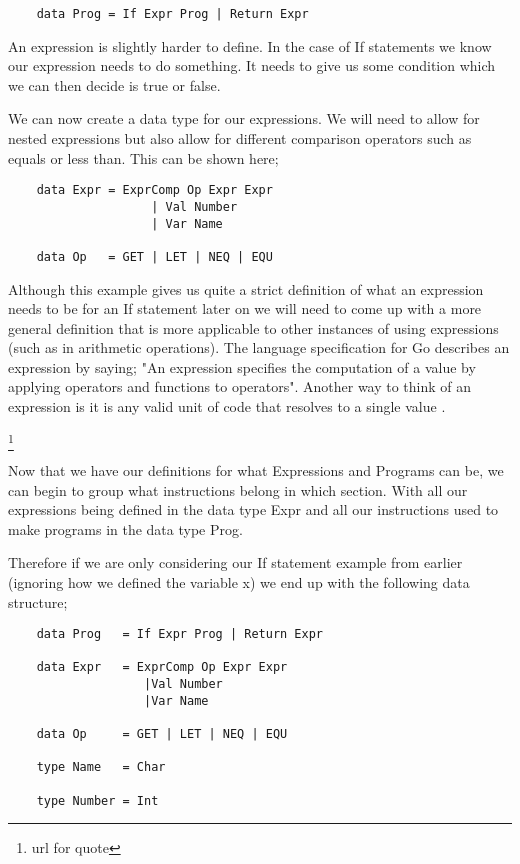 
\begin{lstlisting}
	data Prog = If Expr Prog | Return Expr
\end{lstlisting}


An expression is slightly harder to define. In the case of If statements we know our expression needs to do something. It needs to give us some condition which we can then decide is true or false. 

We can now create a data type for our expressions. We will need to allow for nested expressions but also allow for different comparison operators such as equals or less than. This can be shown here;

\newpage

\begin{lstlisting}
	data Expr = ExprComp Op Expr Expr 
                  	| Val Number 
                 	| Var Name
 
	data Op	  = GET | LET | NEQ | EQU
\end{lstlisting}

Although this example gives us quite a strict definition of what an expression needs to be for an If statement later on we will need to come up with a more general definition that is more applicable to other instances of using expressions (such as in arithmetic operations). The language specification for Go describes an expression by saying; "An expression specifies the computation of a value by applying operators and functions to operators". Another way to think of an expression is it is any valid unit of code that resolves to a single value \footnotemark[3].

\footnote[3]{url for quote}

Now that we have our definitions for what Expressions and Programs can be, we can begin to group what instructions belong in which section. With all our expressions being defined in the data type Expr and all our instructions used to make programs in the data type Prog.

Therefore if we are only considering our If statement example from earlier (ignoring how we defined the variable  x) we end up with the following data structure;

\begin{lstlisting}
	data Prog   = If Expr Prog | Return Expr

	data Expr   = ExprComp Op Expr Expr 
	               |Val Number 
	               |Var Name 

	data Op     = GET | LET | NEQ | EQU

	type Name   = Char

	type Number = Int
\end{lstlisting}

